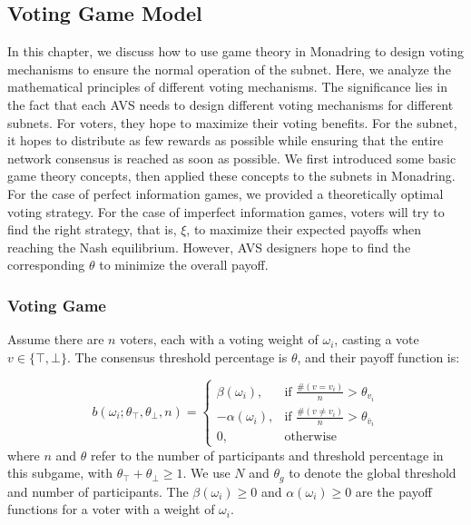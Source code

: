 \documentclass[11pt]{article}
\begin{document}
  \subsection{Voting Game Model}
  \label{sec:voting_game}
  In this chapter, we discuss how to use game theory in Monadring to design voting mechanisms to ensure the normal operation of the subnet. Here, we analyze the mathematical principles of different voting mechanisms. The significance lies in the fact that each AVS needs to design different voting mechanisms for different subnets. For voters, they hope to maximize their voting benefits. For the subnet, it hopes to distribute as few rewards as possible while ensuring that the entire network consensus is reached as soon as possible. We first introduced some basic game theory concepts, then applied these concepts to the subnets in Monadring. For the case of perfect information games, we provided a theoretically optimal voting strategy. For the case of imperfect information games, voters will try to find the right strategy, that is, $\xi$, to maximize their expected payoffs when reaching the Nash equilibrium. However, AVS designers hope to find the corresponding $\theta$ to minimize the overall payoff.
  \subsubsection{Voting Game}
  Assume there are $n$ voters, each with a voting weight of $\omega_i$, casting a vote $v\in{\{\top,\bot\}}$. The consensus threshold percentage is $\theta$, and their payoff function is:
  
  \begin{equation}
  b(\omega_i; \theta_\top,\theta_\bot, n) = 
  \begin{cases}
  \beta(\omega_i), & \text{if } \frac{\#(v = v_i)}{n} > \theta_{v_i} \\
  -\alpha(\omega_i), & \text{if } \frac{\#(v \neq v_i)}{n} > \theta_{\bar{v}_i} \\
  0, & \text{otherwise}
  \end{cases}
  \end{equation}
  where $n$ and $\theta$ refer to the number of participants and threshold percentage in this subgame, with $\theta_\top+\theta_\bot\geq 1$. We use $N$ and $\theta_g$ to denote the global threshold and number of participants. The $\beta(\omega_i)\geq 0$ and $\alpha(\omega_i)\geq 0$ are the payoff functions for a voter with a weight of $\omega_i$.
  
\end{document}
